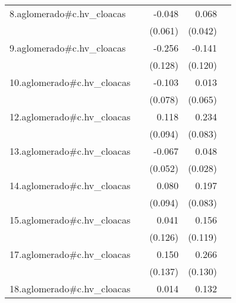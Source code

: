 {\begin{longtable}{l*{4}{D{.}{.}{-1}}}
\addlinespace
8.aglomerado#c.hv\_cloacas&                     &      -0.048         &       0.068         &                     \\
            &                     &     (0.061)         &     (0.042)         &                     \\
\addlinespace
9.aglomerado#c.hv\_cloacas&                     &      -0.256\sym{*}  &      -0.141         &                     \\
            &                     &     (0.128)         &     (0.120)         &                     \\
\addlinespace
10.aglomerado#c.hv\_cloacas&                     &      -0.103         &       0.013         &                     \\
            &                     &     (0.078)         &     (0.065)         &                     \\
\addlinespace
12.aglomerado#c.hv\_cloacas&                     &       0.118         &       0.234\sym{**} &                     \\
            &                     &     (0.094)         &     (0.083)         &                     \\
\addlinespace
13.aglomerado#c.hv\_cloacas&                     &      -0.067         &       0.048         &                     \\
            &                     &     (0.052)         &     (0.028)         &                     \\
\addlinespace
14.aglomerado#c.hv\_cloacas&                     &       0.080         &       0.197\sym{*}  &                     \\
            &                     &     (0.094)         &     (0.083)         &                     \\
\addlinespace
15.aglomerado#c.hv\_cloacas&                     &       0.041         &       0.156         &                     \\
            &                     &     (0.126)         &     (0.119)         &                     \\
\addlinespace
17.aglomerado#c.hv\_cloacas&                     &       0.150         &       0.266\sym{*}  &                     \\
            &                     &     (0.137)         &     (0.130)         &                     \\
\addlinespace
18.aglomerado#c.hv\_cloacas&                     &       0.014         &       0.132\sym{***}&                     \\

\end{longtable}}
